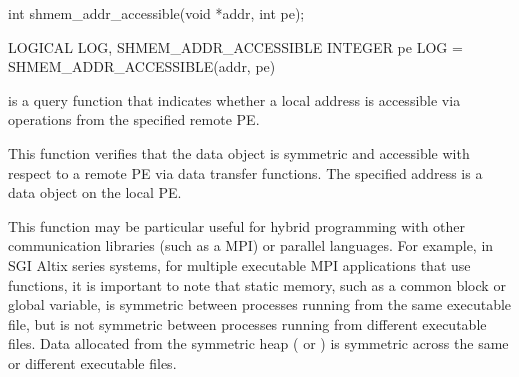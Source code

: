 \synC
int shmem_addr_accessible(void *addr, int pe); %

\synF
LOGICAL LOG, SHMEM_ADDR_ACCESSIBLE
INTEGER pe
LOG = SHMEM_ADDR_ACCESSIBLE(addr, pe) %


{
         is  a  query  function  that indicates whether a
       local address is accessible via \openshmem operations  from the  specified
       remote \ac{PE}. 
       
       This function verifies that the data object is symmetric and accessible
       with respect to a remote \ac{PE} via \openshmem  data  transfer  functions.   The
       specified address  is a data object on the local \ac{PE}. 
       
       This function may be particular useful for hybrid programming with 
       other communication libraries (such as a \ac{MPI}) or parallel languages. 
       For example, in  SGI Altix series systems, for multiple executable MPI applications
       that use \openshmem functions, it is important to note that  static  memory,
       such  as a  \Fortran{}  common  block  or \Clang{} global variable, is symmetric
       between processes running from the same executable  file,  but  is  not
       symmetric  between  processes  running from different executable files.
       Data allocated from  the symmetric  heap  ( or	)  is
       symmetric across the same or different executable files.
}
{
}
\eAPI
